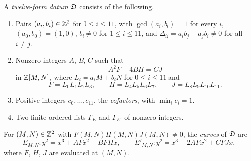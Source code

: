 \begin{definition}\label{def:datum}
A \emph{twelve-form datum} $\mathfrak D$ consists of the following.
\begin{enumerate}[label=(\alph*),ref=(\alph*)]
\item\label{item:datum-forms} Pairs $(a_i,b_i)\in\mathbb Z^2$ for $0\le i\le11$, with $\gcd(a_i,b_i)=1$ for every $i$, $(a_0,b_0)=(1,0)$, $b_i\ne0$ for $1\le i\le11$, and $\Delta_{ij}=a_ib_j-a_jb_i\ne0$ for all $i\ne j$.
\item\label{item:datum-identity} Nonzero integers $A$, $B$, $C$ such that
\begin{equation}\label{eq:datum-identity}
A^2F+4BH=CJ
\end{equation}
in $\mathbb Z[M,N]$, where $L_i=a_iM+b_iN$ for $0\le i\le11$ and
\begin{equation}\label{eq:FHJ}
F=L_0L_1L_2L_3,\qquad H=L_4L_5L_6L_7,\qquad J=L_8L_9L_{10}L_{11}.
\end{equation}
\item\label{item:datum-cofactors} Positive integers $c_0,\dots,c_{11}$, the \emph{cofactors}, with $\min_ic_i=1$.
\item\label{item:datum-constants} Two finite ordered lists $\Gamma_E$ and $\Gamma_{E'}$ of nonzero integers.
\end{enumerate}
For $(M,N)\in\mathbb Z^2$ with $F(M,N)H(M,N)J(M,N)\ne0$, the \emph{curves} of $\mathfrak D$ are
\begin{equation}\label{eq:family-curves}
E_{M,N}\colon y^2=x^3+AFx^2-BFHx,\qquad E'_{M,N}\colon y^2=x^3-2AFx^2+CFJx,
\end{equation}
where $F$, $H$, $J$ are evaluated at $(M,N)$.
\end{definition}

